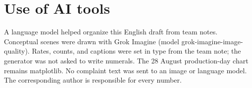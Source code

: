 \documentclass[acmlarge,screen]{acmart}
\begin{document}
\section*{Use of AI tools}
A language model helped organize this English draft from team notes. Conceptual scenes were drawn with Grok Imagine (model grok-imagine-image-quality). Rates, counts, and captions were set in type from the team note; the generator was not asked to write numerals. The 28 August production-day chart remains matplotlib. No complaint text was sent to an image or language model. The corresponding author is responsible for every number.



\end{document}

